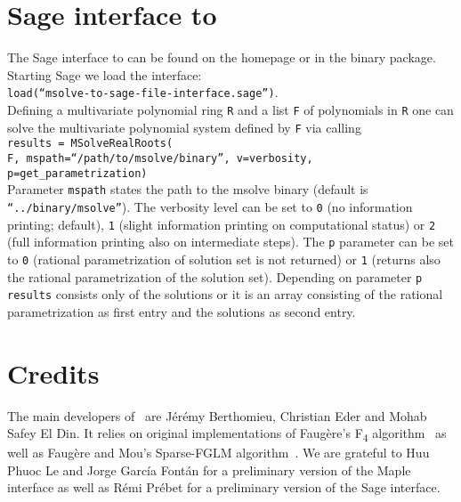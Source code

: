 \documentclass[a4paper,english,11pt]{scrartcl}
\theoremstyle{definition}
\theoremstyle{remark}
\newcommand\Fquatre{\textsc{\texorpdfstring{F\textsubscript{4}}{F4}}\xspace}
\begin{document}
\section{Sage interface to \msolve}
The Sage interface to \msolve can be found on the \msolve homepage or in the
\msolve binary package. Starting
Sage we load the interface:\\[1em]
\texttt{load(“msolve-to-sage-file-interface.sage”)}.\\[1em]
Defining a multivariate polynomial ring \texttt{R} and a list \texttt{F} of
polynomials in \texttt{R} one can solve the multivariate polynomial system
defined by \texttt{F} via calling\\[1em]
\texttt{results = MSolveRealRoots(}\\
\texttt{F, mspath=“/path/to/msolve/binary”,
v=verbosity, p=get\_parametrization)}\\[1em]
Parameter \texttt{mspath} states the path to the msolve binary (default is
\texttt{“../binary/msolve”}).
The verbosity level can be set to \texttt{0} (no information printing; default),
\texttt{1} (slight information printing on computational status) or \texttt{2}
(full information printing also on intermediate steps).
The \texttt{p} parameter can be set to \texttt{0} (rational parametrization of
solution set is not returned) or \texttt{1} (returns also the rational
parametrization of the solution set). Depending on parameter \texttt{p}
\texttt{results} consists only of the solutions or it is an array consisting of
the rational parametrization as first entry and the solutions as second entry.
\section{Credits}

The main developers of \msolve~are J\'er\'emy Berthomieu, Christian Eder and
Mohab Safey El Din. It relies on original implementations of Faugère's \Fquatre
algorithm~\cite{F4} as well as Faug\`ere and Mou's Sparse-FGLM
algorithm~\cite{SparseFGLM}. We are grateful to Huu Phuoc Le and Jorge
García Fontán for a 
preliminary version of the Maple interface as well as Rémi Prébet for a
preliminary version of the Sage interface.  

\renewcommand*{\bibfont}{\small}
  \printbibliography
\end{document}

